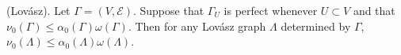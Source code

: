 (Lovász). Let $\Gamma = (V, \mathcal{E})$. Suppose that $\Gamma_U$ is perfect whenever $U \subset V$ and that $\nu_0(\Gamma) \leq \alpha_0(\Gamma)\omega(\Gamma)$. Then for any Lovász graph $\Lambda$ determined by $\Gamma$, $\nu_0(\Lambda) \leq \alpha_0(\Lambda)\omega(\Lambda)$.
